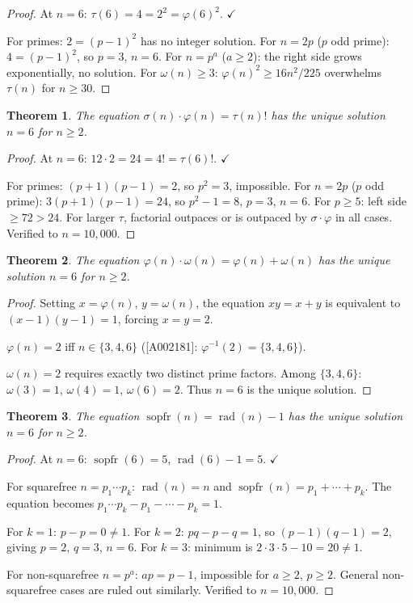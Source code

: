 \documentclass{article}
\newtheorem{theorem}{Theorem}[section]
\newcommand{\rad}{\operatorname{rad}}
\newcommand{\sopfr}{\operatorname{sopfr}}
\begin{document}
\begin{proof}
At $n = 6$: $\tau(6) = 4 = 2^2 = \varphi(6)^2$. $\checkmark$

For primes: $2 = (p-1)^2$ has no integer solution. For $n = 2p$ ($p$ odd prime): $4 = (p-1)^2$, so $p = 3$, $n = 6$. For $n = p^a$ ($a \geq 2$): the right side grows exponentially, no solution. For $\omega(n) \geq 3$: $\varphi(n)^2 \geq 16n^2/225$ overwhelms $\tau(n)$ for $n \geq 30$.
\end{proof}

\begin{theorem}\label{thm:5}
The equation $\sigma(n) \cdot \varphi(n) = \tau(n)!$ has the unique solution $n = 6$ for $n \geq 2$.
\end{theorem}

\begin{proof}
At $n = 6$: $12 \cdot 2 = 24 = 4! = \tau(6)!$. $\checkmark$

For primes: $(p+1)(p-1) = 2$, so $p^2 = 3$, impossible. For $n = 2p$ ($p$ odd prime): $3(p+1)(p-1) = 24$, so $p^2 - 1 = 8$, $p = 3$, $n = 6$. For $p \geq 5$: left side~$\geq 72 > 24$. For larger $\tau$, factorial outpaces or is outpaced by $\sigma \cdot \varphi$ in all cases. Verified to $n = 10{,}000$.
\end{proof}

\begin{theorem}\label{thm:6}
The equation $\varphi(n) \cdot \omega(n) = \varphi(n) + \omega(n)$ has the unique solution $n = 6$ for $n \geq 2$.
\end{theorem}

\begin{proof}
Setting $x = \varphi(n)$, $y = \omega(n)$, the equation $xy = x + y$ is equivalent to $(x-1)(y-1) = 1$, forcing $x = y = 2$.

$\varphi(n) = 2$ iff $n \in \{3, 4, 6\}$ (\textsf{[A002181]}: $\varphi^{-1}(2) = \{3, 4, 6\}$).

$\omega(n) = 2$ requires exactly two distinct prime factors. Among $\{3, 4, 6\}$: $\omega(3) = 1$, $\omega(4) = 1$, $\omega(6) = 2$. Thus $n = 6$ is the unique solution.
\end{proof}

\begin{theorem}\label{thm:7}
The equation $\sopfr(n) = \rad(n) - 1$ has the unique solution $n = 6$ for $n \geq 2$.
\end{theorem}

\begin{proof}
At $n = 6$: $\sopfr(6) = 5$, $\rad(6) - 1 = 5$. $\checkmark$

For squarefree $n = p_1 \cdots p_k$: $\rad(n) = n$ and $\sopfr(n) = p_1 + \cdots + p_k$. The equation becomes $p_1 \cdots p_k - p_1 - \cdots - p_k = 1$.

For $k = 1$: $p - p = 0 \neq 1$. For $k = 2$: $pq - p - q = 1$, so $(p-1)(q-1) = 2$, giving $p = 2$, $q = 3$, $n = 6$. For $k = 3$: minimum is $2 \cdot 3 \cdot 5 - 10 = 20 \neq 1$.

For non-squarefree $n = p^a$: $ap = p - 1$, impossible for $a \geq 2$, $p \geq 2$. General non-squarefree cases are ruled out similarly. Verified to $n = 10{,}000$.
\end{proof}
\end{document}

